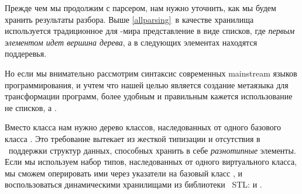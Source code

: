 \secdown

Прежде чем мы продолжим с парсером, нам нужно уточнить, как мы
будем хранить результаты разбора. Выше \ref{allparsing}\ в качестве хранилища
 используется традиционное для
\lisp-мира представление в виде списков, где \emph{первым элементом идет вершина
дерева}, а в следующих элементах находятся поддеревья.

Но если мы внимательно рассмотрим синтаксис современных main\-stream языков
программирования, и учтем что нашей
целью является создание метаязыка для трансформации программ, более
удобным и правильным кажется использование не списков, а .

Вместо класса  нам нужно дерево классов, наследованных от одного
 базового класса . Это требование вытекает из
жесткой типизации и отсутствия в \cpp\ поддержки  структур
данных, способных хранить в себе \emph{разнотипные} элементы. Если мы
используем набор типов, наследованных от одного виртуального класса, мы сможем оперировать ими
через указатели на базовый класс , и воспользоваться динамическими
хранилищами из библиотеки \cpp\ STL:  и
.


